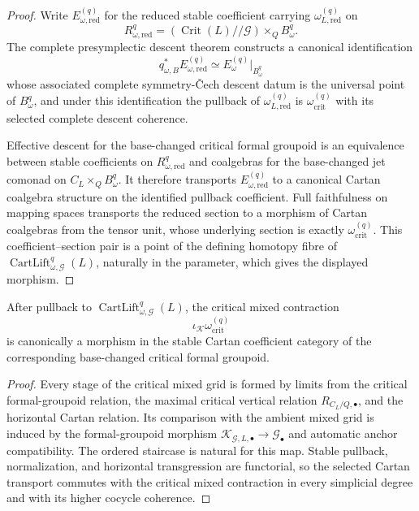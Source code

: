 \begin{proof}
Write $E_{\omega,\mathrm{red}}^{(q)}$ for the reduced stable coefficient carrying
$\omega_{L,\mathrm{red}}^{(q)}$ on
\[
R_{\omega,\mathrm{red}}^q
=
\left(\operatorname{Crit}(L)//\mathcal G\right)\times_QB_\omega^q.
\]
The complete presymplectic descent theorem constructs a canonical identification
\[
q_{\omega,B}^*E_{\omega,\mathrm{red}}^{(q)}
\simeq
E_\omega^{(q)}|_{B_\omega^q}
\]
whose associated complete symmetry-\v{C}ech descent datum is the universal point of
$B_\omega^q$, and under this identification the pullback of
$\omega_{L,\mathrm{red}}^{(q)}$ is
$\omega_{\mathrm{crit}}^{(q)}$ with its selected complete descent coherence.

Effective descent for the base-changed critical formal groupoid is an equivalence
between stable coefficients on $R_{\omega,\mathrm{red}}^q$ and coalgebras for the
base-changed jet comonad on $C_L\times_QB_\omega^q$.  It therefore transports
$E_{\omega,\mathrm{red}}^{(q)}$ to a canonical Cartan coalgebra structure on the
identified pullback coefficient.  Full faithfulness on mapping spaces transports
the reduced section to a morphism of Cartan coalgebras from the tensor unit, whose
underlying section is exactly $\omega_{\mathrm{crit}}^{(q)}$.  This coefficient--section
pair is a point of the defining homotopy fibre of
$\operatorname{CartLift}_{\omega,\mathcal G}^{q}(L)$, naturally in the parameter,
which gives the displayed morphism.
\end{proof}

\begin{proposition}
\label{prop:symmetry-noether-cartan-equivariance-of-mixed-contraction}
After pullback to
$\operatorname{CartLift}_{\omega,\mathcal G}^{q}(L)$, the critical mixed
contraction
\[
\iota_{\mathcal K}\omega_{\mathrm{crit}}^{(q)}
\]
is canonically a morphism in the stable Cartan coefficient category of the
corresponding base-changed critical formal groupoid.
\end{proposition}

\begin{proof}
Every stage of the critical mixed grid is formed by limits from the critical
formal-groupoid relation, the maximal critical vertical relation
$R_{C_L/Q,\bullet}$, and the horizontal Cartan relation.  Its comparison with the
ambient mixed grid is induced by the formal-groupoid morphism
$\mathcal K_{\mathcal G,L,\bullet}\to\mathcal G_\bullet$ and automatic anchor
compatibility.  The ordered staircase is natural for this map.  Stable pullback,
normalization, and horizontal transgression are functorial, so the selected Cartan
transport commutes with the critical mixed contraction in every simplicial degree
and with its higher cocycle coherence.
\end{proof}

